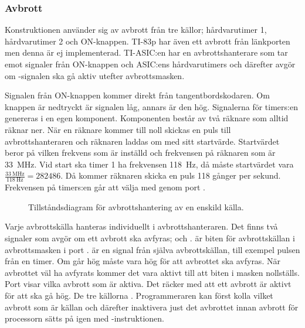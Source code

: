 \documentclass[main.tex]{subfiles}
\begin{document}
\subsubsection{Avbrott}
Konstruktionen använder sig av avbrott från tre källor; hårdvarutimer 1,
hårdvarutimer 2 och ON-knappen. TI-83p har även ett avbrott från länkporten men
denna är ej implementerad. TI-ASIC:en har en avbrottshanterare som tar emot
signaler från ON-knappen och ASIC:ens hårdvarutimers och därefter avgör om
-signalen ska gå aktiv utefter avbrottsmasken.

Signalen från ON-knappen kommer direkt från tangentbordskodaren. Om knappen är
nedtryckt är signalen låg, annars är den hög. Signalerna för timers:en
genereras i en egen komponent. Komponenten består av två räknare som alltid
räknar ner. När en räknare kommer till noll skickas en puls till
avbrottshanteraren och räknaren laddas om med sitt startvärde. Startvärdet
beror på vilken frekvens som är inställd och frekvensen på räknaren som är
\SI{33}{\mega\hertz}. Vid start ska timer 1 ha frekvensen \SI{118}{\hertz}, då
måste startvärdet vara $\frac{\SI{33}{\mega\hertz}}{\SI{118}{\hertz}} =
282486$. Då kommer räknaren skicka en puls 118 gånger per sekund. Frekvensen på
timers:en går att välja med genom port .

\begin{SCfigure}
    \centering
    
    \caption{Tillståndsdiagram för avbrottshantering av en enskild källa.}
    \label{fig:prefix}
\end{SCfigure}

Varje avbrottskälla hanteras individuellt i avbrottshanteraren. Det finns två
signaler som avgör om ett avbrott ska avfyras;  och
.  är biten för avbrottskällan i avbrottsmasken i
port .  är en signal från själva avbrottskällan, till
exempel pulsen från en timer. Om  går hög måste 
vara hög för att avbrottet ska avfyras. När avbrottet väl ha avfyrats kommer
det vara aktivt till att biten i masken nollställs. Port  visar vilka
avbrott som är aktiva. Det räcker med att ett avbrott är aktivt för att
 ska gå hög. De tre källorna . Programmeraren kan först
kolla vilket avbrott som är källan och därefter inaktivera just det avbrottet
innan avbrott för processorn sätts på igen med -instruktionen.
\end{document}
